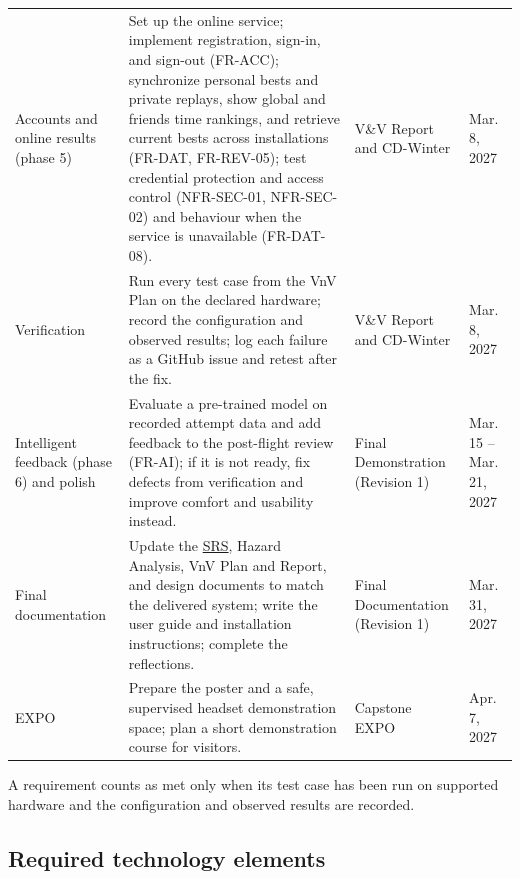 \documentclass[12pt]{article}
\begin{document}
\begin{longtable}{@{}p{}p{}p{}p{}@{}}
Accounts and online results (phase 5) & Set up the online service; implement
registration, sign-in, and sign-out (FR-ACC); synchronize personal bests and
private replays, show global and friends time rankings, and retrieve current
bests across installations (FR-DAT, FR-REV-05); test credential protection and access control (NFR-SEC-01,
NFR-SEC-02) and behaviour when the service is unavailable (FR-DAT-08). &
V\&V Report and CD-Winter & Mar. 8, 2027 \\
Verification & Run every test case from the VnV Plan on the declared
hardware; record the configuration and observed results; log each failure as
a GitHub issue and retest after the fix. & V\&V Report and CD-Winter &
Mar. 8, 2027 \\
Intelligent feedback (phase 6) and polish & Evaluate a pre-trained model on
recorded attempt data and add feedback to the post-flight review (FR-AI);
if it is not ready, fix defects from verification and improve comfort and
usability instead. & Final Demonstration
(Revision 1) & Mar. 15 -- Mar. 21, 2027 \\
Final documentation & Update the \hyperlink{glos:SRS}{SRS}, Hazard Analysis, VnV Plan and Report,
and design documents to match the delivered system; write the user guide and
installation instructions; complete the reflections. & Final Documentation
(Revision 1) & Mar. 31, 2027 \\
EXPO & Prepare the poster and a safe, supervised headset demonstration space;
plan a short demonstration course for visitors. & Capstone EXPO &
Apr. 7, 2027 \\
\end{longtable}

A requirement counts as met only when its test case has been run on
supported hardware and the configuration and observed results are recorded.

\subsection{Required technology elements}\label{p5}
\end{document}
